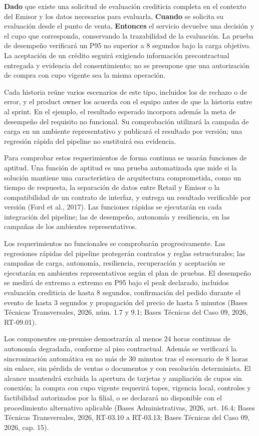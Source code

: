 \documentclass[11pt]{article}
\begin{document}
\textbf{Dado} que existe una solicitud de evaluación crediticia completa en el
contexto del Emisor y los datos necesarios para evaluarla,
\textbf{Cuando} se solicita su evaluación desde el punto de venta,
\textbf{Entonces} el servicio devuelve una decisión y el cupo que
corresponda, conservando la trazabilidad de la evaluación. La prueba de
desempeño verificará un P95 no superior a 8 segundos bajo la carga
objetivo. La aceptación de un crédito seguirá exigiendo información
precontractual entregada y evidencia del consentimiento; no se presupone
que una autorización de compra con cupo vigente sea la misma operación.

Cada historia reúne varios escenarios de este tipo, incluidos los de
rechazo o de error, y el product owner los acuerda con el equipo antes
de que la historia entre al sprint. En el ejemplo, el resultado esperado
incorpora además la meta de desempeño del requisito no funcional. Su
comprobación utilizará la campaña de carga en un ambiente representativo
y publicará el resultado por versión; una regresión rápida del pipeline
no sustituirá esa evidencia.

Para comprobar estos requerimientos de forma continua se usarán funciones de aptitud. Una función de aptitud es una prueba automatizada que mide si la solución mantiene una característica de arquitectura comprometida, como un tiempo de respuesta, la separación de datos entre Retail y Emisor o la compatibilidad de un contrato de interfaz, y entrega un resultado verificable por versión (Ford et al., 2017). Las funciones rápidas se ejecutarán en cada integración del pipeline; las de desempeño, autonomía y resiliencia, en las campañas de los ambientes representativos.

Los requerimientos no funcionales se comprobarán progresivamente. Las
regresiones rápidas del pipeline protegerán contratos y reglas
estructurales; las campañas de carga, autonomía, resiliencia,
recuperación y aceptación se ejecutarán en ambientes representativos
según el plan de pruebas. El desempeño se medirá de extremo a extremo en
P95 bajo el peak declarado, incluidos evaluación crediticia de hasta 8
segundos, confirmación del pedido durante el evento de hasta 3 segundos
y propagación del precio de hasta 5 minutos (Bases Técnicas
Transversales, 2026, núm. 1.7 y 9.1; Bases Técnicas del Caso 09, 2026,
RT-09.01).

Los componentes on-premise demostrarán al menos 24 horas continuas de
autonomía degradada, conforme al piso contractual. Además se verificará
la sincronización automática en no más de 30 minutos tras el escenario
de 8 horas sin enlace, sin pérdida de ventas o documentos y con
resolución determinista. El alcance mantendrá excluida la apertura de
tarjetas y ampliación de cupos sin conexión; la compra con cupo vigente
requerirá topes, vigencia local, controles y factibilidad autorizados
por la filial, o se declarará no disponible con el procedimiento
alternativo aplicable (Bases Administrativas, 2026, art. 16.4; Bases
Técnicas Transversales, 2026, RT-03.10 a RT-03.13; Bases Técnicas del
Caso 09, 2026, cap. 15).
\end{document}
